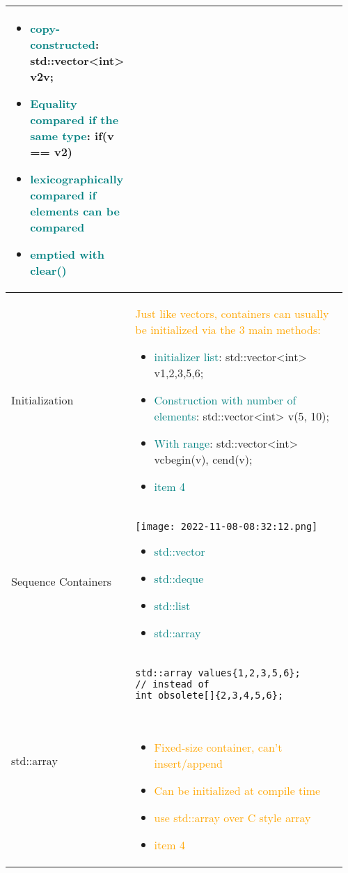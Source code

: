 \documentclass[main.tex,fontsize=8pt,paper=a4,paper=portrait,DIV=calc,]{scrartcl}
\begin{document}
\begin{table}[ht!]
\begin{tabular}{|m{0.2\linewidth}|m{0.755\linewidth}|}
\begin{itemize}
  \item \textcolor{teal}{copy-constructed}: std::vector<int> v2{v};
\item \textcolor{teal}{Equality compared if the same type}: if(v == v2)
\item \textcolor{teal}{lexicographically compared if elements can be compared}
\item \textcolor{teal}{emptied with clear()}
\vspace{2mm}
\end{itemize}\\
\hline
Initialization & 
\textcolor{orange}{Just like vectors, containers can usually be initialized via the 3 main methods: }\newline
\begin{itemize}
  \item \textcolor{teal}{initializer list}: std::vector<int> v{1,2,3,5,6};
  \item \textcolor{teal}{Construction with number of elements}: std::vector<int> v(5, 10);
  \item \textcolor{teal}{With range}: std::vector<int> v{cbegin(v), cend(v)};
\item \textcolor{teal}{item 4}
\vspace{2mm}
\end{itemize}\\
\hline
Sequence Containers & 
\vspace{2mm}
\texttt{[image: 2022-11-08-08:32:12.png]}\newline
\begin{itemize}
\item \textcolor{teal}{std::vector}
\item \textcolor{teal}{std::deque}
\item \textcolor{teal}{std::list}
\item \textcolor{teal}{std::array}
\vspace{2mm}
\end{itemize}\\
\hline
std::array &
\vspace{2mm}
\begin{lstlisting}
std::array values{1,2,3,5,6};
// instead of
int obsolete[]{2,3,4,5,6};
\end{lstlisting}
\, \newline
\begin{itemize}
\item \textcolor{orange}{Fixed-size container, can't insert/append}
\item \textcolor{orange}{Can be initialized at compile time}
\item \textcolor{orange}{use std::array over C style array}
\item \textcolor{orange}{item 4}
\vspace{2mm}
\end{itemize}\\ 
\hline
\end{tabular}
\end{table}
\end{document}
